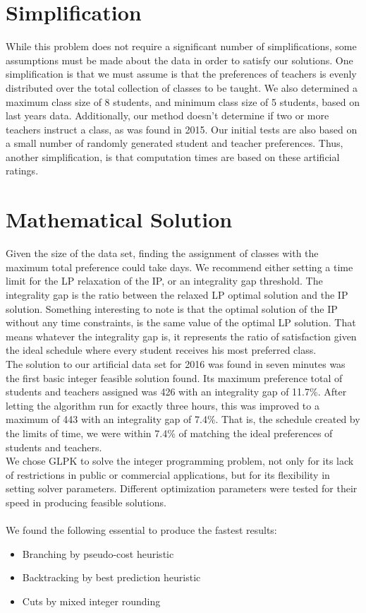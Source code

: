 \documentclass[11pt]{article}
\begin{document}
\section{Simplification}
While this problem does not require a significant number of simplifications, some assumptions must be made about the data in order to satisfy our solutions. One simplification is that we must assume is that the preferences of teachers is evenly distributed over the total collection of classes to be taught. We also determined a maximum class size of 8 students, and minimum class size of 5 students, based on last years data. Additionally, our method doesn't determine if two or more teachers instruct a class, as was found in 2015. Our initial tests are also based on a small number of randomly generated student and teacher preferences. Thus, another simplification, is that computation times are based on these artificial ratings. \\


\section{Mathematical Solution}
\indent Given the size of the data set, finding the assignment of classes with the maximum total preference could take days. We recommend either setting a time limit for the LP relaxation of the IP, or an integrality gap threshold. The integrality gap is the ratio between the relaxed LP optimal solution and the IP solution. Something interesting to note is that the optimal solution of the IP without any time constraints, is the same value of the optimal LP solution. That means whatever the integrality gap is, it represents the ratio of satisfaction given the ideal schedule where every student receives his most preferred class.\\
\indent The solution to our artificial data set for 2016 was found in seven minutes was the first basic integer feasible solution found. Its maximum preference total of students and teachers assigned was 426 with an integrality gap of 11.7\%.  After letting the algorithm run for exactly three hours, this was improved to a maximum of 443 with an integrality gap of 7.4\%. That is, the schedule created by the limits of time, we were within 7.4\% of matching the ideal preferences of students and teachers.\\
\indent We chose GLPK to solve the integer programming problem, not only for its lack of restrictions in public or commercial applications, but for its flexibility in setting solver parameters. Different optimization parameters were tested for their speed in producing feasible solutions.\\\\
We found the following essential to produce the fastest results:
\begin{itemize}
	\item Branching by pseudo-cost heuristic
	\item Backtracking by best prediction heuristic
	\item Cuts by mixed integer rounding
\end{itemize}
\end{document}
